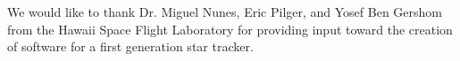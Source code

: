 \begin{acks}
We would like to thank Dr. Miguel Nunes, Eric Pilger, and Yosef Ben Gershom from the Hawaii Space Flight Laboratory for providing input toward the creation of software for a first generation star tracker.
\end{acks}
